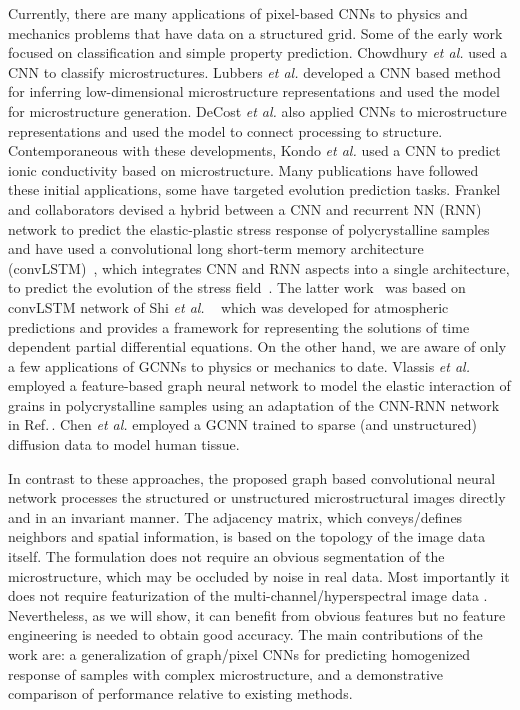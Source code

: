 \documentclass[12pt,reqno]{article}
\newcommand{\ADD}[1]{{#1}}
\newcommand{\cref}[1]{Ref.\,\cite{#1}}
\newcommand{\etal}{{\it et al.} }
\begin{document}
Currently, there are many applications of \ADD{pixel}-based CNNs to physics and mechanics problems \ADD{that have data on a structured grid}.
Some of the early work focused on classification and simple property prediction.
Chowdhury \etal \cite{chowdhury2016image} used a CNN to classify microstructures.
Lubbers \etal \cite{lubbers2017inferring} developed a CNN based method for inferring low-dimensional microstructure representations and used the model for microstructure generation.
DeCost \etal \cite{decost2017exploring} also applied CNNs to microstructure representations and used the model to connect processing to structure.
Contemporaneous with these developments, Kondo \etal \cite{kondo2017microstructure} used a CNN to predict ionic conductivity based on microstructure.
Many publications have followed these initial applications, some have targeted evolution prediction tasks.
Frankel and collaborators devised a hybrid between a CNN and recurrent NN (RNN) network to predict the elastic-plastic stress response of polycrystalline samples~\cite{frankel2019oligocrystals} and have used a convolutional long short-term memory architecture (convLSTM)~\cite{xingjian2015convolutional}, which integrates CNN and RNN  aspects into a single architecture, to predict the evolution of the stress field~\cite{frankel2019evolution}.
The latter work~\cite{frankel2019evolution} was based on convLSTM network of Shi \etal~\cite{shi2015convolutional} which was developed for atmospheric predictions and provides a framework for representing the solutions of time dependent partial differential equations.
On the other hand, we are aware of only a few applications of GCNNs to physics or mechanics to date.
Vlassis \etal \cite{vlassis2020geometric} employed a feature-based graph neural network to model the elastic interaction of grains in polycrystalline samples using an adaptation of the CNN-RNN network in \cref{frankel2019oligocrystals}.
Chen \etal \cite{chen2020estimating} employed a GCNN trained to  sparse (and unstructured) diffusion data to model human tissue.

In contrast to these approaches, the proposed graph based convolutional neural network processes the structured or unstructured microstructural images directly and in an invariant manner.
The adjacency matrix, which conveys/defines neighbors and spatial information, is based on the topology of the image data itself.
The formulation does not require an obvious segmentation of the microstructure, which may be occluded by noise in real data.
Most importantly it does not require featurization of the multi-channel/hyperspectral image data \cite{bessa2017framework,mozaffar2019deep}.
Nevertheless, as we will show, it can benefit from obvious features but no feature engineering is needed to obtain good accuracy.
The main contributions of the work are: a generalization of graph/pixel CNNs for predicting homogenized response of samples with complex microstructure, and a demonstrative comparison of performance relative to existing methods.
\end{document}
